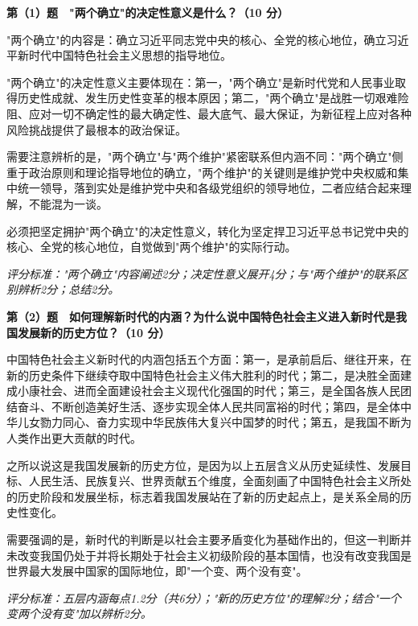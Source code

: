 \documentclass[12pt, a4paper]{article}
\newcounter{bigq}
\newcommand{\BigQ}[1]{%
  \stepcounter{bigq}%
  \vspace{6pt}%
  \noindent{\large\bfseries 第\chinese{bigq}大题\quad #1}%
  \vspace{4pt}\par
}
\begin{document}
\BigQ{简答题参考答案}

\begin{answerbox}

\textbf{第（1）题　"两个确立"的决定性意义是什么？（10 分）}

"两个确立"的内容是：确立习近平同志党中央的核心、全党的核心地位，确立习近平新时代中国特色社会主义思想的指导地位。

"两个确立"的决定性意义主要体现在：第一，"两个确立"是新时代党和人民事业取得历史性成就、发生历史性变革的根本原因；第二，"两个确立"是战胜一切艰难险阻、应对一切不确定性的最大确定性、最大底气、最大保证，为新征程上应对各种风险挑战提供了最根本的政治保证。

需要注意辨析的是，"两个确立"与"两个维护"紧密联系但内涵不同："两个确立"侧重于政治原则和理论指导地位的确立，"两个维护"的关键则是维护党中央权威和集中统一领导，落到实处是维护党中央和各级党组织的领导地位，二者应结合起来理解，不能混为一谈。

必须把坚定拥护"两个确立"的决定性意义，转化为坚定捍卫习近平总书记党中央的核心、全党的核心地位，自觉做到"两个维护"的实际行动。

\textit{评分标准："两个确立"内容阐述2分；决定性意义展开4分；与"两个维护"的联系区别辨析2分；总结2分。}

\vspace{6pt}
\textbf{第（2）题　如何理解新时代的内涵？为什么说中国特色社会主义进入新时代是我国发展新的历史方位？（10 分）}

中国特色社会主义新时代的内涵包括五个方面：第一，是承前启后、继往开来，在新的历史条件下继续夺取中国特色社会主义伟大胜利的时代；第二，是决胜全面建成小康社会、进而全面建设社会主义现代化强国的时代；第三，是全国各族人民团结奋斗、不断创造美好生活、逐步实现全体人民共同富裕的时代；第四，是全体中华儿女勠力同心、奋力实现中华民族伟大复兴中国梦的时代；第五，是我国不断为人类作出更大贡献的时代。

之所以说这是我国发展新的历史方位，是因为以上五层含义从历史延续性、发展目标、人民生活、民族复兴、世界贡献五个维度，全面刻画了中国特色社会主义所处的历史阶段和发展坐标，标志着我国发展站在了新的历史起点上，是关系全局的历史性变化。

需要强调的是，新时代的判断是以社会主要矛盾变化为基础作出的，但这一判断并未改变我国仍处于并将长期处于社会主义初级阶段的基本国情，也没有改变我国是世界最大发展中国家的国际地位，即"一个变、两个没有变"。

\textit{评分标准：五层内涵每点1.2分（共6分）；"新的历史方位"的理解2分；结合"一个变两个没有变"加以辨析2分。}


\end{answerbox}
\end{document}
